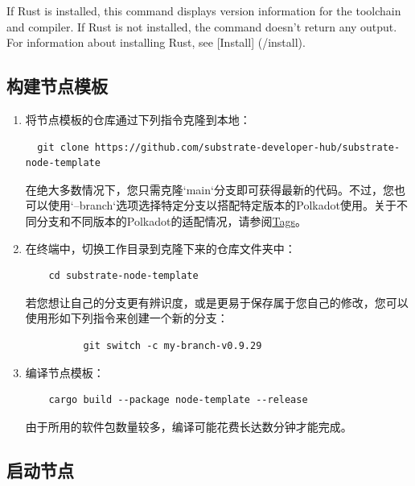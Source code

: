 If Rust is installed, this command displays version information for the toolchain and compiler.
If Rust is not installed, the command doesn't return any output.
For information about installing Rust, see [Install] (/install).

\subsection{构建节点模板}

\begin{enumerate}
  \item 将节点模板的仓库通过下列指令克隆到本地：
        \begin{lstlisting}
  git clone https://github.com/substrate-developer-hub/substrate-node-template
  \end{lstlisting}

        在绝大多数情况下，您只需克隆`main`分支即可获得最新的代码。不过，您也可以使用`--branch`选项选择特定分支以搭配特定版本的Polkadot使用。关于不同分支和不同版本的Polkadot的适配情况，请参阅\href{https://github.com/substrate-developer-hub/substrate-node-template/tags}{Tags}。

  \item 在终端中，切换工作目录到克隆下来的仓库文件夹中：
        \begin{lstlisting}
    cd substrate-node-template
  \end{lstlisting}
        若您想让自己的分支更有辨识度，或是更易于保存属于您自己的修改，您可以使用形如下列指令来创建一个新的分支：
        \begin{lstlisting}
          git switch -c my-branch-v0.9.29
        \end{lstlisting}
  \item 编译节点模板：
        \begin{lstlisting}
    cargo build --package node-template --release
  \end{lstlisting}
        由于所用的软件包数量较多，编译可能花费长达数分钟才能完成。
\end{enumerate}

\subsection{启动节点}

